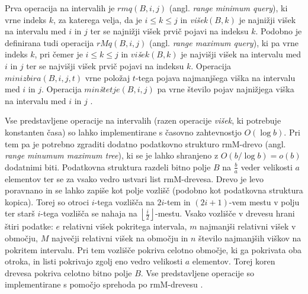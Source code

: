 Prva operacija na intervalih je $rmq(B,i,j)$ (angl. \textit{range minimum query}), ki vrne indeks $k$, za katerega velja, da je $i\le k\le j$ in \textit{višek}$(B,k)$ je najnižji višek na intervalu med $i$ in $j$ ter se najnižji višek prvič pojavi na indeksu $k$. Podobno je definirana tudi operacija $rMq(B,i,j)$ (angl. \textit{range maximum query}), ki pa vrne indeks $k$, pri čemer je $i\le k\le j$ in $vi$\textit{š}$ek(B,k)$ je najvišji višek na intervalu med $i$ in $j$ ter se najvišji višek prvič pojavi na indeksu $k$. Operacija $minizbira(B,i,j,t)$ vrne položaj $t$-tega pojava najmanjšega viška na intervalu med $i$ in $j$. Operacija $min$\textit{š}$tetje(B,i,j)$ pa vrne število pojav najnižjega viška na intervalu med $i$ in $j$ \cite{Navarro2016}.

Vse predstavljene operacije na intervalih (razen operacije \textit{višek}, ki potrebuje konstanten časa) so lahko implementirane s časovno zahtevnostjo $O(\log{b})$. Pri tem pa je potrebno zgraditi dodatno podatkovno strukturo rmM-drevo (angl. \textit{range minumum maximum tree}), ki se je lahko shranjeno z $O(b/\log{b})=o(b)$ dodatnimi biti. Podatkovna struktura razdeli bitno polje $B$ na $\frac{b}{a}$ veder velikosti $a$ elementov ter se za vsako vedro ustvari list rmM-drevesa. Drevo je levo poravnano in se lahko zapiše kot polje vozlišč (podobno kot podatkovna struktura kopica). Torej so otroci $i$-tega vozlišča na $2i$-tem in $(2i+1)$-vem mestu v polju ter starš $i$-tega vozlišča se nahaja na $\left\lfloor\frac{i}{2}\right\rfloor$-mestu. Vsako vozlišče v drevesu hrani štiri podatke: $e$ relativni višek pokritega intervala, $m$ najmanjši relativni višek v območju, $M$ največji relativni višek na območju in $n$ število najmanjših viškov na pokritem intervalu. Pri tem vozlišče pokriva celotno območje, ki ga pokrivata oba otroka, in listi pokrivajo zgolj eno vedro velikosti $a$ elementov. Torej koren drevesa pokriva celotno bitno polje $B$. Vse predstavljene operacije so implementirane s pomočjo sprehoda po rmM-drevesu \cite{Navarro2016}.

